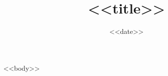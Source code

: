 \documentclass[11pt,a4paper]{article}
\title{<<title>>}
\date{<<date>>}
\begin{document}
\maketitle
<<body>>
\end{document}

